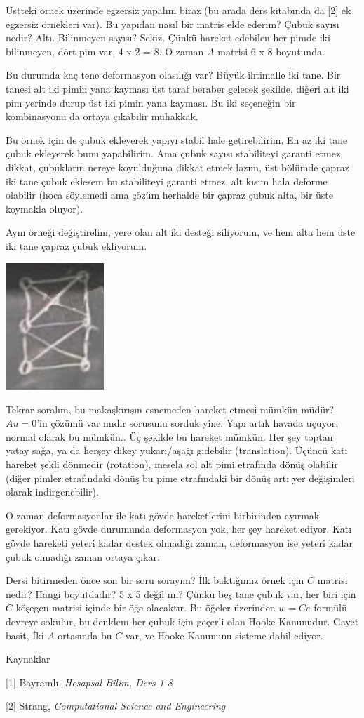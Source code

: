 \documentclass[12pt,fleqn]{article}\usepackage{../../common}
\begin{document}
Üstteki örnek üzerinde egzersiz yapalım biraz (bu arada ders kitabında da [2] ek
egzersiz örnekleri var). Bu yapıdan nasıl bir matris elde ederim? Çubuk sayısı
nedir? Altı. Bilinmeyen sayısı? Sekiz. Çünkü hareket edebilen her pimde
iki bilinmeyen, dört pim var, 4 x 2 = 8. O zaman $A$ matrisi 6 x 8 boyutunda.

Bu durumda kaç tene deformasyon olasılığı var? Büyük ihtimalle iki tane.  Bir
tanesi alt iki pimin yana kayması üst taraf beraber gelecek şekilde, diğeri
alt iki pim yerinde durup üst iki pimin yana kayması. Bu iki seçeneğin bir
kombinasyonu da ortaya çıkabilir muhakkak.

Bu örnek için de çubuk ekleyerek yapıyı stabil hale getirebilirim. En az iki
tane çubuk ekleyerek bunu yapabilirim. Ama çubuk sayısı stabiliteyi garanti
etmez, dikkat, çubukların nereye koyulduğuna dikkat etmek lazım, üst bölümde
çapraz iki tane çubuk eklesem bu stabiliteyi garanti etmez, alt kısım hala
deforme olabilir (hoca söylemedi ama çözüm herhalde bir çapraz çubuk alta, bir
üste koymakla oluyor).

Aynı örneği değiştirelim, yere olan alt iki desteği siliyorum, ve hem
alta hem üste iki tane çapraz çubuk ekliyorum. 

\includegraphics[width=10em]{compscieng_1_15_07.png}

Tekrar soralım, bu makaşkırışın esnemeden hareket etmesi mümkün müdür? $Au =
0$'in çözümü var mıdır sorusunu sorduk yine. Yapı artık havada uçuyor, normal
olarak bu mümkün.. Üç şekilde bu hareket mümkün. Her şey toptan yatay sağa, ya
da herşey dikey yukarı/aşağı gidebilir (translation). Üçüncü katı hareket şekli
dönmedir (rotation), mesela sol alt pimi etrafında dönüş olabilir (diğer pimler
etrafındaki dönüş bu pime etrafındaki bir dönüş artı yer değişimleri olarak
indirgenebilir).

O zaman deformasyonlar ile katı gövde hareketlerini birbirinden ayırmak
gerekiyor. Katı gövde durumunda deformasyon yok, her şey hareket ediyor.
Katı gövde hareketi yeteri kadar destek olmadığı zaman, deformasyon ise
yeteri kadar çubuk olmadığı zaman ortaya çıkar.

Dersi bitirmeden önce son bir soru sorayım? İlk baktığımız örnek için $C$
matrisi nedir? Hangi boyutdadır? 5 x 5 değil mi? Çünkü beş tane çubuk var, her
biri için $C$ köşegen matrisi içinde bir öğe olacaktır.  Bu öğeler üzerinden $w
= C e$ formülü devreye sokulur, bu denklem her çubuk için geçerli olan Hooke
Kanunudur. Gayet basit, İki $A$ ortasında bu $C$ var, ve Hooke Kanununu sisteme
dahil ediyor.

Kaynaklar

[1] Bayramlı, {\em Hesapsal Bilim, Ders 1-8}

[2] Strang, {\em Computational Science and Engineering}
\end{document}
